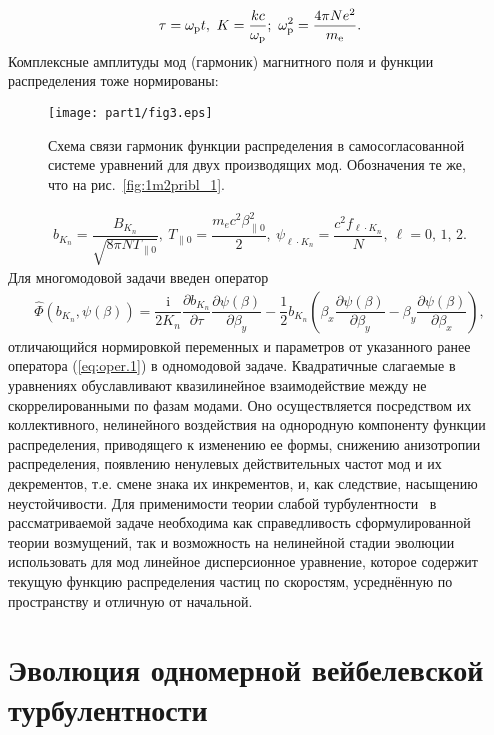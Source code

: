 \begin{align}
\label{eq19plus2}
    \tau=\wpl t, \
    K=\dfrac{kc}{\wpl}; \ 
    \wpl^2=\dfrac{4\pi Ne^2}{\me}.
\end{align}
Комплексные амплитуды мод (гармоник) магнитного поля и функции распределения тоже нормированы:
\begin{figure}[b]
\centering
\texttt{[image: part1/fig3.eps]}
\caption{Схема связи гармоник функции распределения в самосогласованной системе уравнений для двух производящих мод. Обозначения те же, что на рис.~\ref{fig:1m2pribl_1}.}
\label{fig:2m2pribl}
\end{figure}


\begin{align}
\label{eq19plus1}
    b_{K_{n}}=\dfrac{B_{K_{n}}}{\sqrt{8\pi N T_{\|0}}},\
    T_{\|0}=\dfrac{m_ec^2\beta_{\|0}^2}{2},\  \psi_{\ell\cdot K_{n}}=\dfrac{c^2f_{\ell\cdot K_{n}}}{N},
    \ \ell=0,\,1,\,2.  
\end{align}
Для многомодовой задачи введен оператор 
\begin{align}
\label{eq:oper.2}\hat \Phi(b_{K_n},\psi(\beta)) =  \dfrac{\mathrm{i}}{2K_n}\dfrac{\partial b_{K_n}}{\partial \tau}\dfrac{\partial \psi(\beta)}{\partial \beta_y} -\dfrac{1}{2}b_{K_n} \left(\beta_x\dfrac{\partial \psi(\beta)}{\partial \beta_y}-\beta_y\dfrac{\partial \psi(\beta)}{\partial \beta_x}\right) ,
\end{align}
отличающийся нормировкой переменных и параметров от указанного ранее оператора (\ref{eq:oper.1}) в одномодовой задаче. Квадратичные слагаемые в уравнениях обуславливают квазилинейное взаимодействие между не скоррелированными по фазам модами. Оно осуществляется посредством их коллективного, нелинейного воздействия на однородную компоненту функции распределения, приводящего к изменению ее формы, снижению анизотропии распределения, появлению ненулевых действительных частот мод и их декрементов, т.е. смене знака их инкрементов, и, как следствие, насыщению неустойчивости. Для применимости теории слабой турбулентности~\cite{Krall1975,Vedenov1962} в рассматриваемой задаче необходима как справедливость сформулированной теории возмущений, так и возможность на нелинейной стадии эволюции использовать для мод линейное дисперсионное уравнение, которое содержит текущую функцию распределения частиц по скоростям, усреднённую по пространству и отличную от начальной.


\section{Эволюция одномерной вейбелевской турбулентности}\label{sec:ch1/sec2}

